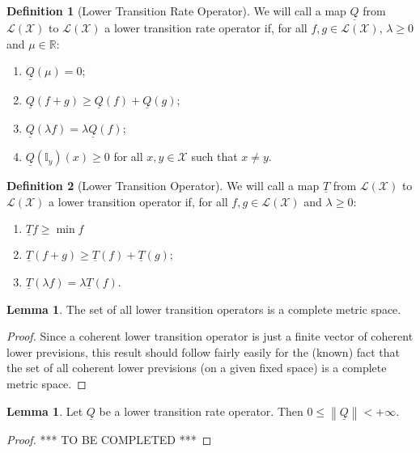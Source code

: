 \documentclass[10pt]{paper}
\theoremstyle{definition}
\newtheorem{lemma}[theorem]{Lemma}
\newtheorem{definition}{Definition}
\newcommand{\reals}{\mathbb{R}}
\newcommand{\states}{\mathcal{X}}
\newcommand{\lt}{\underline{T}}
\newcommand{\gambles}{\mathcal{L}}
\newcommand{\gamblesX}{\gambles(\states)}
\newcommand{\ind}[1]{\mathbb{I}_{#1}}
\newcommand{\lrate}{\underline{Q}}
\newcommand{\norm}[1]{\left\lVert #1 \right\rVert}
\begin{document}
\begin{definition}[Lower Transition Rate Operator]\label{def:coh_low_trans_rate}
We will call a map $\lrate$ from $\gamblesX$ to $\gamblesX$ a lower transition rate operator if, for all $f,g\in\gamblesX$, $\lambda\geq0$ and $\mu\in\reals$:

\vspace{5pt}
\begin{enumerate}[label=LR\arabic*:,ref=LR\arabic*]
\item\label{LR:constantzero}
$\lrate(\mu)=0$;
\item\label{LR:subadditive}
$\lrate(f+g)\geq\lrate(f)+\lrate(g)$;
\item\label{LR:homo}
$\lrate(\lambda f)=\lambda\lrate(f)$;
\item\label{LR:nondiagpos}
$\lrate(\ind{y})(x)\geq0$ for all $x,y\in\states$ such that $x\neq y$.
\end{enumerate}
\vspace{5pt}
\end{definition}


\begin{definition}[Lower Transition Operator]\label{def:coh_low_trans}
We will call a map $\lt$ from $\gamblesX$ to $\gamblesX$ a lower transition operator if, for all $f,g\in\gamblesX$ and $\lambda\geq0$:

\vspace{5pt}
\begin{enumerate}[label=C\arabic*:]
\item
$\lt f\geq\min f$
\item
$\lt(f+g)\geq\lt(f)+\lt(g)$;
\item
$\lt(\lambda f)=\lambda\lt(f)$.
\end{enumerate}
\vspace{5pt}
\end{definition}

\begin{lemma}\label{lemma:completemetricspace}
The set of all lower transition operators is a complete metric space.
\end{lemma}
\begin{proof}
Since a coherent lower transition operator is just a finite vector of coherent lower previsions, this result should follow fairly easily for the (known) fact that the set of all coherent lower previsions (on a given fixed space) is a complete metric space.
\end{proof}

\begin{lemma}\label{lem:normlratefinite}
Let $\lrate$ be a lower transition rate operator. Then $0\leq\norm{\lrate}<+\infty$.
\end{lemma}
\begin{proof}
*** TO BE COMPLETED ***
\end{proof}
\end{document}
